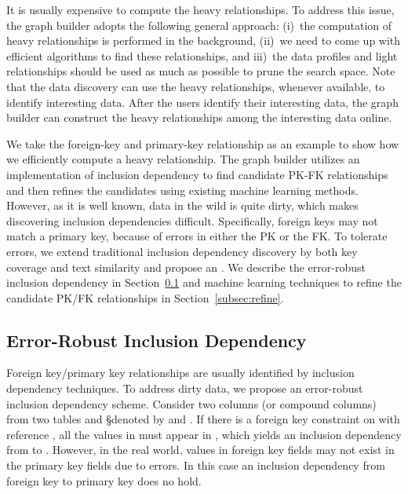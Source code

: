 It is usually expensive to compute the heavy relationships. To address this
issue, the graph builder adopts the following general approach: (i)~the
computation of heavy relationships is performed in the background, (ii)~we need
to come up with efficient algorithms to find these relationships, and iii)~the
data profiles and light relationships should be used as much as possible to
prune the search space. Note that the data discovery can use the heavy
relationships, whenever available, to identify interesting data. After the
users identify their interesting data, the graph builder can construct the heavy
relationships among the interesting data online.

We take the foreign-key and primary-key relationship as an example to show how
we efficiently compute a heavy relationship. The graph builder utilizes an
implementation of inclusion dependency to find candidate PK-FK relationships and
then refines the candidates using existing machine learning methods. However,
as it is well known, data in the wild is quite dirty, which makes discovering
inclusion dependencies difficult. Specifically, foreign keys may not match a
primary key, because of errors in either the PK or the FK. To tolerate errors,
we extend traditional inclusion dependency discovery by both key coverage and
text similarity and propose an \emph{\eind}. We describe the error-robust
inclusion dependency in Section~\ref{subsec:eind} and machine learning
techniques to refine the candidate PK/FK relationships in
Section~\ref{subsec:refine}.

\subsection{Error-Robust Inclusion Dependency}\label{subsec:eind}

Foreign key/primary key relationships are usually identified by inclusion
dependency techniques.  To address dirty data, we propose an error-robust
inclusion dependency scheme.
Consider two columns (or compound columns) from two tables \R and \S denoted by
\RX and \SY. If there is a foreign key constraint on \RX with reference \SY, all
the values in \RX must appear in \SY, which yields an inclusion dependency from
\RX to \SY. However, in the real world, values in foreign key fields may not
exist in the primary key fields due to errors.  In this case an inclusion
dependency from foreign key to primary key does no hold.

